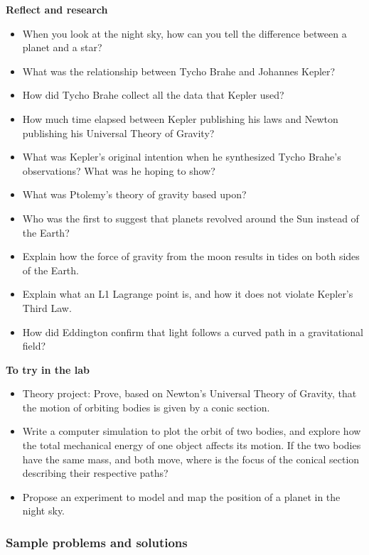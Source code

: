 \begin{framed}
\textbf{Reflect and research}\\
\begin{itemize}
\item When you look at the night sky, how can you tell the difference between a planet and a star?
\item What was the relationship between Tycho Brahe and Johannes Kepler?
\item How did Tycho Brahe collect all the data that Kepler used?
\item How much time elapsed between Kepler publishing his laws and Newton publishing his Universal Theory of Gravity?
\item What was Kepler's original intention when he synthesized Tycho Brahe's observations? What was he hoping to show?
\item What was Ptolemy's theory of gravity based upon?
\item Who was the first to suggest that planets revolved around the Sun instead of the Earth?
\item Explain how the force of gravity from the moon results in tides on both sides of the Earth.
\item Explain what an L1 Lagrange point is, and how it does not violate Kepler's Third Law.
\item How did Eddington confirm that light follows a curved path in a gravitational field?
\end{itemize}
\end{framed}

\begin{framed}
\textbf{To try in the lab}\\
\begin{itemize}
\item Theory project: Prove, based on Newton's Universal Theory of Gravity, that the motion of orbiting bodies is given by a conic section.
\item Write a computer simulation to plot the orbit of two bodies, and explore how the total mechanical energy of one object affects its motion. If the two bodies have the same mass, and both move, where is the focus of the conical section describing their respective paths?
\item Propose an experiment to model and map the position of a planet in the night sky.
\end{itemize}
\end{framed}

\subsubsection{Sample problems and solutions}

